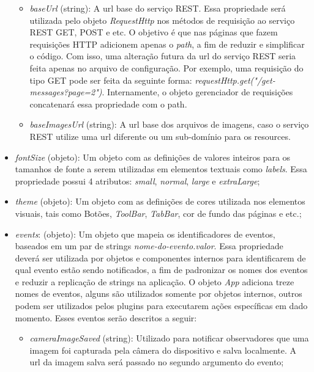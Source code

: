 \begin{itemize}
\begin{itemize}
		\item \textit{baseUrl} (string): A url base do serviço REST. Essa propriedade será utilizada pelo objeto \textit{RequestHttp} nos métodos de requisição ao serviço REST GET, POST e etc. O objetivo é que nas páginas que fazem requisições HTTP adicionem apenas o \textit{path}, a fim de reduzir e simplificar o código. Com isso, uma alteração futura da url do serviço REST seria feita apenas no arquivo de configuração. Por exemplo, uma requisição do tipo GET pode ser feita da seguinte forma: \textit{requestHttp.get("/get-messages?page=2")}. Internamente, o objeto gerenciador de requisições concatenará essa propriedade com o path.

		\item \textit{baseImagesUrl} (string): A url base dos arquivos de imagens, caso o serviço REST utilize uma url diferente ou um sub-domínio para os resources.
	\end{itemize}

	\item \textit{fontSize} (objeto): Um objeto com as definições de valores inteiros para os tamanhos de fonte a serem utilizadas em elementos textuais como \textit{labels}. Essa propriedade possui 4 atributos: \textit{small}, \textit{normal}, \textit{large} e \textit{extraLarge};

	\item \textit{theme} (objeto): Um objeto com as definições de cores utilizada nos elementos visuais, tais como Botões, \textit{ToolBar}, \textit{TabBar}, cor de fundo das páginas e etc.;

	\item \textit{events}: (objeto): Um objeto que mapeia os identificadores de eventos, baseados em um par de strings \textit{nome-do-evento.valor}. Essa propriedade deverá ser utilizada por objetos e componentes internos para identificarem de qual evento estão sendo notificados, a fim de padronizar os nomes dos eventos e reduzir a replicação de strings na aplicação. O objeto \textit{App} adiciona treze nomes de eventos, alguns são utilizados somente por objetos internos, outros podem ser utilizados pelos plugins para executarem ações específicas em dado momento. Esses eventos serão descritos a seguir:

	\begin{itemize}
		\item \textit{cameraImageSaved} (string): Utilizado para notificar observadores que uma imagem foi capturada pela câmera do dispositivo e salva localmente. A url da imagem salva será passado no segundo argumento do evento;


\end{itemize}
\end{itemize}
